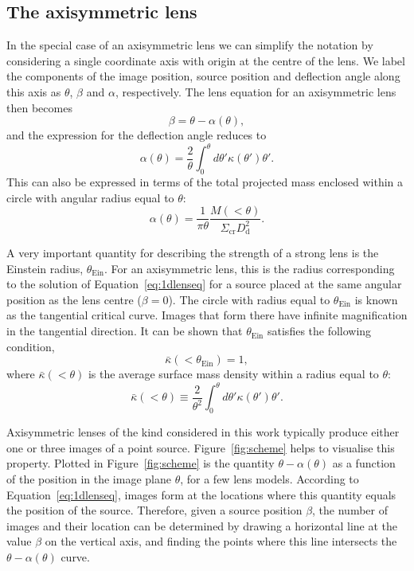 \documentclass{aa}
\def\tein{\theta_{\mathrm{Ein}}}
\def\Fref#1{Figure~\ref{#1}\xspace}
\def\Eref#1{Equation~\ref{#1}\xspace}
\begin{document}
\subsection{The axisymmetric lens}\label{ssec:axisymm}

In the special case of an axisymmetric lens we can simplify the notation by considering a single coordinate axis with origin at the centre of the lens. We label the components of the image position, source position and deflection angle along this axis as $\theta$, $\beta$ and $\alpha$, respectively.
The lens equation for an axisymmetric lens then becomes
\begin{equation}\label{eq:1dlenseq}
\beta = \theta - \alpha(\theta),
\end{equation}
and the expression for the deflection angle reduces to
\begin{equation}
\alpha(\theta) = \frac{2}{\theta}\int_0^{\theta} d\theta' \kappa(\theta') \theta'.
\end{equation}
This can also be expressed in terms of the total projected mass enclosed within a circle with angular radius equal to $\theta$:
\begin{equation}
\alpha(\theta) = \frac{1}{\pi\theta}\dfrac{M(<\theta)}{\Sigma_{\mathrm{cr}}D_{\mathrm{d}}^2}.
\end{equation}

A very important quantity for describing the strength of a strong lens is the Einstein radius, $\tein$. For an axisymmetric lens, this is the radius corresponding to the solution of \Eref{eq:1dlenseq} for a source placed at the same angular position as the lens centre ($\beta=0$).
The circle with radius equal to $\tein$ is known as the tangential critical curve. Images that form there have infinite magnification in the tangential direction.
%
It can be shown that $\tein$ satisfies the following condition,
\begin{equation}\label{eq:criteq}
\bar{\kappa}(<\tein) = 1,
\end{equation}
where $\bar{\kappa}(<\theta)$ is the average surface mass density within a radius equal to $\theta$:
\begin{equation}
\bar{\kappa}(<\theta) \equiv \frac{2}{\theta^2}\int_0^{\theta}d\theta' \kappa(\theta')\theta'.
\end{equation}

Axisymmetric lenses of the kind considered in this work 
typically produce either one or three images of a point source.
\Fref{fig:scheme} helps to visualise this property.
Plotted in \Fref{fig:scheme} is the quantity $\theta - \alpha(\theta)$ as a function of the position in the image plane $\theta$, for a few lens models.
According to \Eref{eq:1dlenseq}, images form at the locations where this quantity equals the position of the source. 
Therefore, given a source position $\beta$, the number of images and their location can be determined by drawing a horizontal line at the value $\beta$ on the vertical axis, and finding the points where this line intersects the $\theta - \alpha(\theta)$ curve.
\end{document}

